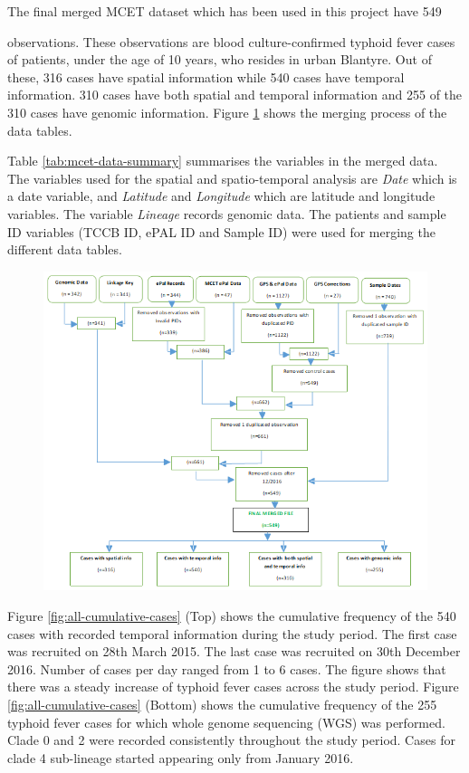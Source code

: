 The final merged MCET dataset which has been used in this project have 549 

\restoregeometry

observations.
These observations are blood culture-confirmed typhoid fever cases of patients, under the age of 10 years, who resides in urban Blantyre.
Out of these, 316 cases have spatial information while 540 cases have temporal information.
310 cases have both spatial and temporal information and 255 of the 310 cases have genomic information.
Figure \ref{fig:flow-diagram} shows the merging process of the data tables.

Table \ref{tab:mcet-data-summary} summarises the variables in the merged data.
The variables used for the spatial and spatio-temporal analysis are \textit{Date} which is a date variable, and \textit{Latitude} and \textit{Longitude} which are latitude and longitude variables.
The variable \textit{Lineage} records genomic data.
The patients and sample ID variables (TCCB ID, ePAL ID and Sample ID) were used for merging the different data tables.

\begin{figure}[H]
    \includegraphics[scale=0.85]{MCET_Project_Data_Merging_Flow_Diagram.png}
     \label{fig:flow-diagram}
\end{figure}

Figure \ref{fig:all-cumulative-cases} (Top) shows the cumulative frequency of the 540 cases with recorded temporal information during the study period.
The first case was recruited on 28th March 2015.
The last case was recruited on 30th December 2016.
Number of cases per day ranged from 1 to 6 cases.
The figure shows that there was a steady increase of typhoid fever cases across the study period.
Figure \ref{fig:all-cumulative-cases} (Bottom) shows the cumulative frequency of the 255 typhoid fever cases for which whole genome sequencing (WGS) was performed.
Clade 0 and 2 were recorded consistently throughout the study period.
Cases for clade 4 sub-lineage started appearing only from January 2016.

